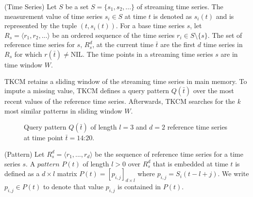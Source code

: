 \documentclass[abstracton,12pt,oneside]{scrreprt}
\begin{document}
\begin{defn}
	(Time Series) Let $S$ be a set $S = \{s_1,s_2,...\}$ of streaming time series. The measurement value of time series $s_i \in S$ at time $t$ is denoted as $s_i(t)$ and is represented by the tuple $(t,s_i(t))$. For a base time series $s$, let $R_s = \langle r_1, r_2,...\rangle$ be an ordered sequence of the time series $r_i \in S \setminus \{s\}$. The set of $\text{reference time series}$ for $s$, $R_s^d$, at the current time $\bar{t}$ are the first $d$ time series in $R_s$ for which $r(\bar{t}) \neq \text{NIL}$. The time points in a streaming time series $s$ are in time window $W$.
\end{defn}

TKCM retains a sliding window of the streaming time series in main memory.
To impute a missing value, TKCM defines a query pattern $Q(\bar{t})$ over the most recent values of the reference time series. Afterwards, TKCM searches for the \emph{k} most similar patterns in sliding window $W$.  
\begin{figure}[H]
	\centering
	\caption{Query pattern $Q(\bar{t})$ of length $l=3$ and $d=2$ reference time series at time point $\bar{t}=\text{14:20}$.} \label{QPat}
\end{figure}
\begin{defn}
	\label{pattCell}
	(Pattern) Let $R_s^d=\langle r_1,...,r_d \rangle$ be the sequence of reference time series for a time series $s$. A $pattern$ $P(t)$ of length $l > 0$ over $R_s^d$ that is embedded at time $t$ is defined as a $d\times l$ matrix $P(t) = [p_{i,j}]_{d\times l}$ where $p_{i,j}=S_i(t-l+j)$. We write $p_{i,j}\in P(t)$ to denote that value $p_{i,j}$ is contained in $P(t)$.
\end{defn}
\end{document}
